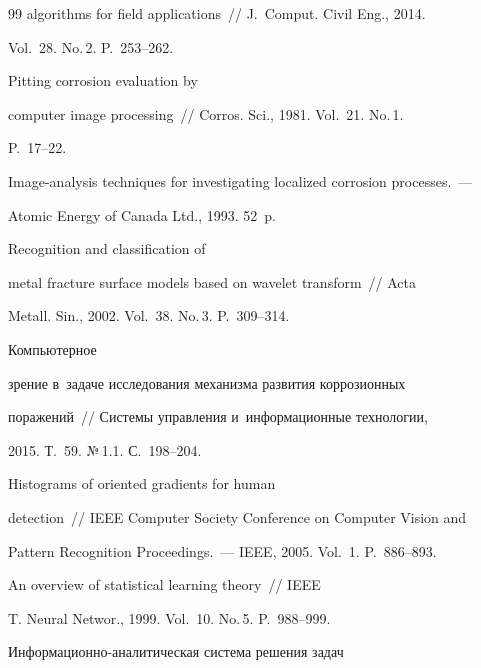 {{\begin{thebibliography}{99}
algorithms for field applications~/\!\!/ J.~Comput. Civil Eng., 2014. 


Vol.~28. No.\,2. P.~253--262.




 Pitting corrosion evaluation by 


computer image processing~/\!\!/ Corros. Sci., 1981. Vol.~21. No.\,1. 


P.~17--22.






Image-analysis techniques for investigating localized corrosion processes.~--- 


Atomic Energy of Canada Ltd., 1993. 52~p.




 Recognition and classification of 


metal fracture surface models based on wavelet transform~/\!\!/ Acta 


Metall. Sin., 2002. Vol.~38. No.\,3. P.~309--314.




 Компьютерное 


зрение в~задаче исследования механизма развития коррозионных 


поражений~/\!\!/ Системы управления и~информационные технологии, 


2015. Т.~59. №\,1.1. С.~198--204.




 Histograms of oriented gradients for human 


detection~/\!\!/  IEEE Computer Society Conference on Computer Vision and 


Pattern Recognition Proceedings.~--- IEEE, 2005. Vol.~1. P.~886--893.




 An overview of statistical learning theory~/\!\!/ IEEE 


T. Neural Networ., 1999. Vol.~10. No.\,5. P.~988--999.






Ин\-фор\-ма\-ци\-он\-но-ана\-ли\-ти\-че\-ская сис\-те\-ма решения задач 



\end{thebibliography}}}
